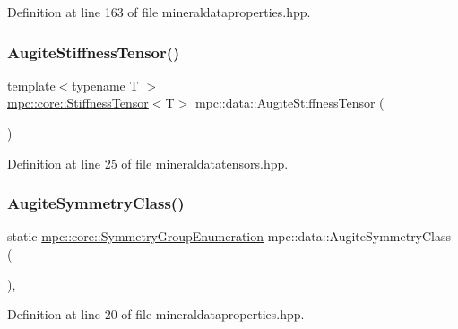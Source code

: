Definition at line 163 of file mineraldataproperties.\+hpp.

\mbox{\label{namespacempc_1_1data_acb1e90920b2d75cd9202cfe03cd98c1b}} 
\subsubsection{\texorpdfstring{Augite\+Stiffness\+Tensor()}{AugiteStiffnessTensor()}}
{\footnotesize\ttfamily template$<$typename T $>$ \\
\mbox{\hyperlink{structmpc_1_1core_1_1_stiffness_tensor}{mpc\+::core\+::\+Stiffness\+Tensor}}$<$T$>$ mpc\+::data\+::\+Augite\+Stiffness\+Tensor (\begin{DoxyParamCaption}{ }\end{DoxyParamCaption})}



Definition at line 25 of file mineraldatatensors.\+hpp.

\mbox{\label{namespacempc_1_1data_a6cef2edb2766a0fb3de56fae388d1c3f}} 
\subsubsection{\texorpdfstring{Augite\+Symmetry\+Class()}{AugiteSymmetryClass()}}
{\footnotesize\ttfamily static \mbox{\hyperlink{namespacempc_1_1core_a9d979684062547055a0ef5c13077bad8}{mpc\+::core\+::\+Symmetry\+Group\+Enumeration}} mpc\+::data\+::\+Augite\+Symmetry\+Class (\begin{DoxyParamCaption}{ }\end{DoxyParamCaption})\hspace{0.3cm}{\ttfamily [inline]}, {\ttfamily [static]}}



Definition at line 20 of file mineraldataproperties.\+hpp.

\mbox{\label{namespacempc_1_1data_a99ca11695e7e2a29954bc7a46be5c11b}} 

